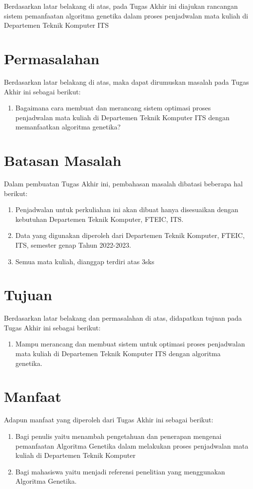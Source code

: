 Berdasarkan latar belakang di atas, pada Tugas Akhir ini diajukan rancangan sistem pemanfaatan algoritma genetika dalam proses penjadwalan mata kuliah di Departemen Teknik Komputer ITS
\section{Permasalahan}
\label{sec:permasalahan}

Berdasarkan latar belakang di atas, maka dapat dirumuskan masalah pada Tugas Akhir ini sebagai berikut:
\begin{enumerate}
    \item Bagaimana cara membuat dan merancang sistem optimasi proses penjadwalan mata kuliah di Departemen Teknik Komputer ITS dengan memanfaatkan algoritma genetika?
\end{enumerate}
\section{Batasan Masalah}
\label{sec:batasanmasalah}

Dalam pembuatan Tugas Akhir ini, pembahasan masalah dibatasi beberapa hal berikut:
\begin{enumerate}
    \item Penjadwalan untuk perkuliahan ini akan dibuat hanya disesuaikan dengan kebutuhan Departemen Teknik Komputer, FTEIC, ITS.
    \item Data yang digunakan diperoleh dari Departemen Teknik Komputer, FTEIC, ITS, semester genap Tahun 2022-2023.
    \item Semua mata kuliah, dianggap terdiri atas 3sks
\end{enumerate}

\section{Tujuan}
\label{sec:Tujuan}

Berdasarkan latar belakang dan permasalahan di atas, didapatkan tujuan pada Tugas Akhir ini sebagai berikut:
\begin{enumerate}
    \item Mampu merancang dan membuat sistem untuk optimasi proses penjadwalan mata kuliah di Departemen Teknik Komputer ITS dengan algoritma genetika.
\end{enumerate}

\section{Manfaat}
\label{sec:manfaat}

Adapun manfaat yang diperoleh dari Tugas Akhir ini sebagai berikut:
\begin{enumerate}
    \item Bagi penulis yaitu menambah pengetahuan dan penerapan mengenai pemanfaatan Algoritma Genetika dalam melakukan proses penjadwalan mata kuliah di Departemen Teknik Komputer 
    \item Bagi mahasiswa yaitu menjadi referensi penelitian yang menggunakan Algoritma Genetika.
\end{enumerate}